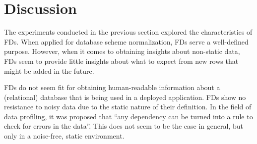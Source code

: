\newpage
\section{Discussion}
The experiments conducted in the previous section explored the characteristics of FDs.
When applied for database scheme normalization, FDs serve a well-defined purpose.
However, when it comes to obtaining insights about non-static data, FDs seem to provide little insights about what to expect from new rows that might be added in the future.

FDs do not seem fit for obtaining human-readable information about a (relational) database that is being used in a deployed application.
FDs show no resistance to noisy data due to the static nature of their definition.
In the field of data profiling, it was proposed that ``any dependency can be turned into a rule to check for errors in the data''.\cite[p.~9]{ABE19}
This does not seem to be the case in general, but only in a noise-free, static environment.
